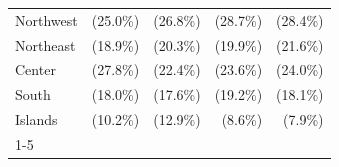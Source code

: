 \documentclass{article}
\begin{document}
\begin{table}[!h]
\begin{tabular}{lllll}
\multicolumn{1}{l}{\hspace{1em}Northwest} &
  \multicolumn{1}{r}{(25.0\%)} &
  \multicolumn{1}{r}{(26.8\%)} &
  \multicolumn{1}{r}{(28.7\%)} &
  \multicolumn{1}{r}{(28.4\%)} \\
\multicolumn{1}{l}{\hspace{1em}Northeast} &
  \multicolumn{1}{r}{(18.9\%)} &
  \multicolumn{1}{r}{(20.3\%)} &
  \multicolumn{1}{r}{(19.9\%)} &
  \multicolumn{1}{r}{(21.6\%)} \\
\multicolumn{1}{l}{\hspace{1em}Center} &
  \multicolumn{1}{r}{(27.8\%)} &
  \multicolumn{1}{r}{(22.4\%)} &
  \multicolumn{1}{r}{(23.6\%)} &
  \multicolumn{1}{r}{(24.0\%)} \\
\multicolumn{1}{l}{\hspace{1em}South} &
  \multicolumn{1}{r}{(18.0\%)} &
  \multicolumn{1}{r}{(17.6\%)} &
  \multicolumn{1}{r}{(19.2\%)} &
  \multicolumn{1}{r}{(18.1\%)} \\
\multicolumn{1}{l}{\hspace{1em}Islands} &
  \multicolumn{1}{r}{(10.2\%)} &
  \multicolumn{1}{r}{(12.9\%)} &
  \multicolumn{1}{r}{(8.6\%)} &
  \multicolumn{1}{r}{(7.9\%)} \\
\cline{1-5}
\end{tabular}
\end{table}
\end{document}
